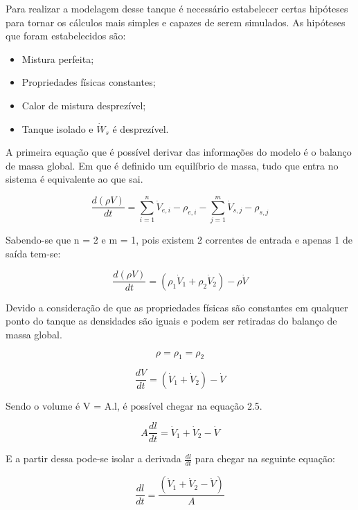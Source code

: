 \documentclass[
	12pt,				%
	openright,			%
	oneside,			%
	a4paper,			%
	english,			%
	french,				%
	spanish,			%
	brazil				%
	]{abntex2}
\begin{document}
Para realizar a modelagem desse tanque é necessário estabelecer certas hipóteses para tornar os cálculos mais simples e capazes de serem simulados. As hipóteses que foram estabelecidos são:

\begin{itemize}
\item Mistura perfeita;
\item Propriedades físicas constantes;
\item Calor de mistura desprezível;
\item Tanque isolado e $\dot{W}_{s}$ é desprezível.
\end{itemize}

A primeira equação que é possível derivar das informações do modelo é o balanço de massa global. Em que é definido um equilíbrio de massa, tudo que entra no sistema é equivalente ao que sai. 

\begin{equation}
\frac{d(\rho V)}{dt}=\sum\limits_{i=1}^{n}\dot{V}_{e,i}-\rho_{e,i}-\sum\limits_{j=1}^{m}\dot{V}_{s,j}-\rho_{s,j}
\end{equation}

Sabendo-se que n = 2 e m = 1, pois existem 2 correntes de entrada e apenas 1 de saída tem-se: 

\begin{equation}
\frac{d(\rho V)}{dt}=(\rho_{1}\dot{V}_{1}+\rho_{2}\dot{V}_{2})-\rho \dot{V}
\end{equation}

Devido a consideração de que as propriedades físicas são constantes em qualquer ponto do tanque as densidades são iguais e podem ser retiradas do balanço de massa global.

\begin{equation}
\rho=\rho_{1}=\rho_{2}
\end{equation}

\begin{equation}
\frac{dV}{dt}=(\dot{V}_{1}+\dot{V}_{2})-\dot{V}
\end{equation}

Sendo o volume é V = A.l, é possível chegar na equação 2.5.

\begin{equation}
A\frac{dl}{dt}=\dot{V}_{1}+\dot{V}_{2}-\dot{V}
\end{equation}

E a partir dessa pode-se isolar a derivada $\frac{dl}{dt}$ para chegar na seguinte equação:

\begin{equation}
\frac{dl}{dt}=\frac{(\dot{V}_{1}+\dot{V}_{2}-\dot{V})}{A}
\end{equation}
\end{document}
